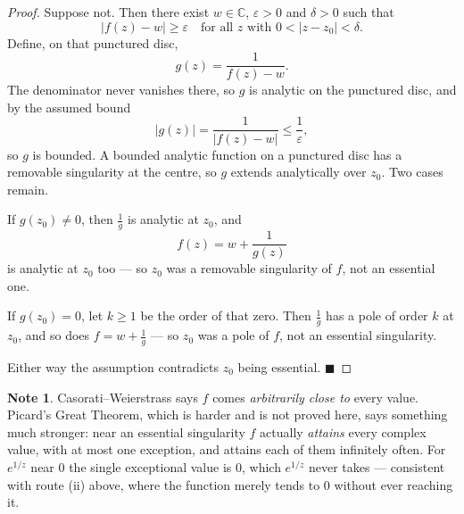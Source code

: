 \documentclass[11pt,a4paper]{article}
\theoremstyle{definition}
\newtheorem{note}[thm]{Note}
\begin{document}
\begin{proof}
Suppose not. Then there exist $w \in \mathbb{C}$, $\varepsilon > 0$ and
$\delta > 0$ such that
$$\left|f(z) - w\right| \geq \varepsilon \quad 
\text{for all } z \text{ with } 0 < \left|z - z_0\right| < \delta .$$
Define, on that punctured disc,
$$g(z) = \frac{1}{f(z) - w}.$$
The denominator never vanishes there, so $g$ is analytic on the punctured disc,
and by the assumed bound
$$\left|g(z)\right| = \frac{1}{\left|f(z) - w\right|} \leq \frac{1}{\varepsilon},$$
so $g$ is bounded. A bounded analytic function on a punctured disc has a
removable singularity at the centre, so $g$ extends analytically over $z_0$.
Two cases remain.

If $g(z_0) \neq 0$, then $\frac{1}{g}$ is analytic at $z_0$, and
$$f(z) = w + \frac{1}{g(z)}$$
is analytic at $z_0$ too --- so $z_0$ was a removable singularity of $f$, not an
essential one.

If $g(z_0) = 0$, let $k \geq 1$ be the order of that zero. Then
$\frac{1}{g}$ has a pole of order $k$ at $z_0$, and so does
$f = w + \frac{1}{g}$ --- so $z_0$ was a pole of $f$, not an essential
singularity.

Either way the assumption contradicts $z_0$ being essential. $\blacksquare$
\end{proof}

\begin{note}
Casorati--Weierstrass says $f$ comes \emph{arbitrarily close to} every value.
Picard's Great Theorem, which is harder and is not proved here, says something
much stronger: near an essential singularity $f$ actually \emph{attains} every
complex value, with at most one exception, and attains each of them infinitely
often. For $e^{1/z}$ near $0$ the single exceptional value is $0$, which
$e^{1/z}$ never takes --- consistent with route (ii) above, where the function
merely tends to $0$ without ever reaching it.
\end{note}
\end{document}
